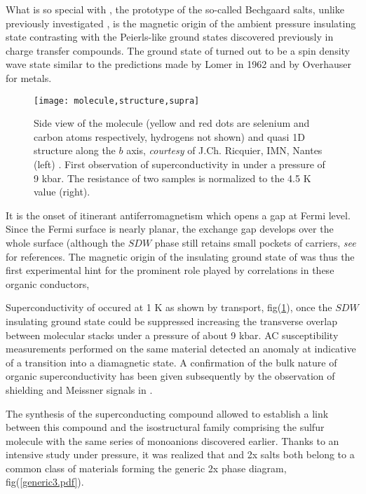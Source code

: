 \documentclass[11pt]{article} %
\begin{document}
What is  so special with , the prototype of the so-called  Bechgaard salts, unlike previously investigated \tq ,  is the magnetic origin of the ambient pressure insulating state\cite{Andrieux81} contrasting with the Peierls-like ground states discovered previously in charge transfer compounds. The ground state of  turned out to be a spin density wave state similar to the predictions made by  Lomer\cite{Lomer62} in 1962 and by Overhauser\cite{Overhauser60a} for metals.  
\begin{figure}[h]	
 \centerline{\texttt{[image: molecule,structure,supra]}}
\caption{Side view of the \tsm molecule (yellow and red dots are selenium and carbon  atoms respectively, hydrogens not shown) and  quasi 1D structure along the $b$ axis, \textit{courtesy} of J.Ch. Ricquier, IMN, Nantes (left) . First observation of superconductivity in  under a pressure of 9 kbar\cite{Jerome80}. The resistance of two samples is normalized to the 4.5 K value (right). }
\label{PF6supra.pdf} 
\end{figure}
It is the onset of itinerant antiferromagnetism which opens a gap at Fermi level. Since the  Fermi surface is nearly planar, the exchange gap develops over the whole surface (although the $SDW$ phase still retains  small pockets of carriers, \textit{see} \cite{Ishiguro98} for references.  The magnetic origin of the insulating ground state of   was thus the first experimental hint for the prominent role played by correlations in these organic conductors,

Superconductivity of  occured at 1 K as shown by transport, fig(\ref{PF6supra.pdf}), once the $SDW$ insulating ground state could be suppressed increasing the transverse overlap between molecular stacks under a pressure of about 9 kbar\cite{Jerome80}. AC susceptibility measurements performed on the same material detected an anomaly at \tc indicative of a transition into a diamagnetic state\cite{Ribault80}. A confirmation of the bulk nature of organic superconductivity has been given subsequently by the observation of shielding and   Meissner signals in \cite{Andres80}.

The synthesis of the superconducting compound  allowed to establish a link between this  compound and the isostructural  family  comprising the sulfur molecule with the same series of monoanions discovered earlier. Thanks to an intensive study  under pressure, it was realized that \tfx and  \tms2x salts both belong to a common class  of materials forming the generic \tm2x phase diagram\cite{Jerome91}, fig(\ref{generic3.pdf}).    
\end{document}
